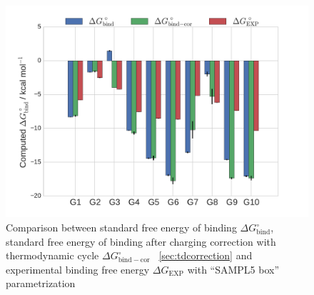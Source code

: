 \documentclass[11pt,oneside,a4paper]{article}
\begin{document}

\begin{figure}[h]
\caption{Comparison between standard free energy of binding $\Delta G_\mathrm{bind}^\circ$, standard free energy of binding after charging correction with thermodynamic cycle $\Delta G_\mathrm{bind-cor}^\circ$ ~\ref{sec:tdcorrection} and experimental binding free energy $\Delta G_\mathrm{EXP}$ with ``SAMPL5 box'' parametrization\label{fig:fig3}}
 \includegraphics[width=\textwidth]{figures/Fig3.pdf}
 \centering
\end{figure}
\end{document}
